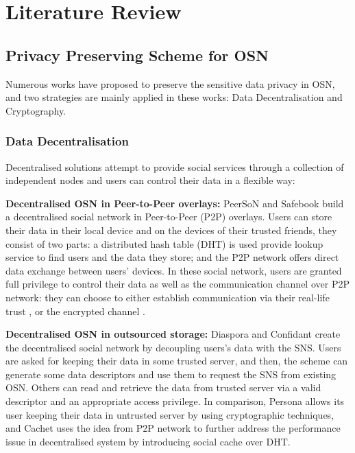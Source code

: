 \chapter{Literature Review}

\section{Privacy Preserving Scheme for OSN}
Numerous works have proposed to preserve the sensitive data privacy in OSN, and two strategies are mainly applied in these works: Data Decentralisation and Cryptography.

\subsection{Data Decentralisation}
Decentralised solutions attempt to provide social services through a collection of independent nodes and users can control their data in a flexible way:

{\bf Decentralised OSN in Peer-to-Peer overlays:} PeerSoN \cite{buchegger2009peerson} and Safebook \cite{cutillo2009safebook} build a decentralised social network in Peer-to-Peer (P2P) overlays. Users can store their data in their local device and on the devices of their trusted friends, they consist of two parts: a distributed hash table (DHT) is used provide lookup service to find users and the data they store; and the P2P network offers direct data exchange between users' devices. In these social network, users are granted full privilege to control their data as well as the communication channel over P2P network: they can choose to either establish communication via their real-life trust \cite{cutillo2009safebook}, or the encrypted channel \cite{buchegger2009peerson}.

{\bf Decentralised OSN in outsourced storage:} Diaspora \cite{diaspora2017diaspora} and Confidant \cite{liu2011confidant} create the decentralised social network by decoupling users's data with the SNS. Users are asked for keeping their data in some trusted server, and then, the scheme can generate some data descriptors and use them to request the SNS from existing OSN. Others can read and retrieve the data from trusted server via a valid descriptor and an appropriate access privilege. 
In comparison, Persona \cite{baden2009persona} allows its user keeping their data in untrusted server by using cryptographic techniques, and Cachet \cite{nilizadeh2012cachet} uses the idea from P2P network to further address the performance issue in decentralised system by introducing social cache over DHT.

